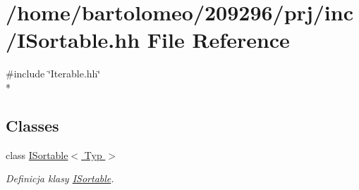 \hypertarget{_i_sortable_8hh}{\section{/home/bartolomeo/209296/prj/inc/\-I\-Sortable.hh File Reference}
\label{_i_sortable_8hh}
}
{\ttfamily \#include \char`\"{}Iterable.\-hh\char`\"{}}\\*
\subsection*{Classes}
\begin{DoxyCompactItemize}
\item 
class \hyperlink{class_i_sortable}{I\-Sortable$<$ Typ $>$}
\begin{DoxyCompactList}\small\item\em Definicja klasy \hyperlink{class_i_sortable}{I\-Sortable}. \end{DoxyCompactList}\end{DoxyCompactItemize}
